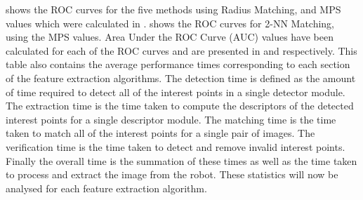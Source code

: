\documentclass[11pt]{report}
\begin{document}
 shows the ROC curves for the five methods using Radius Matching, and MPS values which were calculated in .  shows the ROC curves for 2-NN Matching, using the MPS values. Area Under the ROC Curve (AUC) values have been calculated for each of the ROC curves and are presented in  and  respectively. This table also contains the average performance times corresponding to each section of the feature extraction algorithms. The detection time is defined as the amount of time required to detect all of the interest points in a single detector module. The extraction time is the time taken to compute the descriptors of the detected interest points for a single descriptor module. The matching time is the time taken to match all of the interest points for a single pair of images. The verification time is the time taken to detect and remove invalid interest points. Finally the overall time is the summation of these times as well as the time taken to process and extract the image from the robot. These statistics will now be analysed for each feature extraction algorithm. \\
\end{document}
